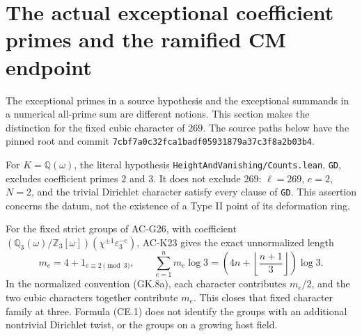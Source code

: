\section{The actual exceptional coefficient primes and the ramified CM endpoint}
\label{sec:cubic-exceptional-coefficients}

The exceptional primes in a source hypothesis and the exceptional
summands in a numerical all-prime sum are different notions.  This
section makes the distinction for the fixed cubic character of
$269$.  The source paths below have the pinned root
and commit \texttt{7cbf7a0c32fca1badf05931879a37c3f8a2b03b4}.

\begin{proposition}
\label{AC-K29-exceptional}
For $K=\mathbb Q(\omega)$, the literal hypothesis
\texttt{HeightAndVanishing/Counts.lean}, \texttt{GD}, excludes
coefficient primes $2$ and $3$.  It does not exclude $269$:
$\ell=269$, $e=2$, $N=2$, and the trivial Dirichlet character
satisfy every clause of \texttt{GD}.
This assertion concerns the datum, not the existence of a Type II
point of its deformation ring.

For the fixed strict groups of AC-G26, with coefficient
$(\mathbb Q_3(\omega)/\mathbb Z_3[\omega])
 (\chi^{\pm1}\varepsilon_3^{-e})$, AC-K23 gives the exact
unnormalized length
\[
 m_e=4+1_{e\equiv2\pmod3},\qquad
 \sum_{e=1}^{n}m_e\log3
   =\left(4n+\left\lfloor\frac{n+1}{3}\right\rfloor\right)\log3.
                                                               \tag{CE.1}
\]
In the normalized convention (GK.8a), each character contributes
$m_e/2$, and the two cubic characters together contribute $m_e$.
This closes that fixed character family at three.  Formula (CE.1)
does not identify the groups with an additional nontrivial
Dirichlet twist, or the groups on a growing host field.
\end{proposition}

